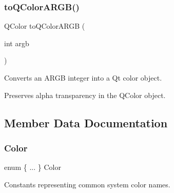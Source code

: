 \subsubsection{\texorpdfstring{to\+Q\+Color\+A\+R\+G\+B()}{toQColorARGB()}}
{\footnotesize\ttfamily Q\+Color to\+Q\+Color\+A\+R\+GB (\begin{DoxyParamCaption}\item[{int}]{argb }\end{DoxyParamCaption})\hspace{0.3cm}{\ttfamily [static]}}



Converts an A\+R\+GB integer into a Qt color object. 

Preserves alpha transparency in the Q\+Color object. 

\subsection{Member Data Documentation}
\mbox{\label{classGColor_a829e668b6af432af22e4fe68feff8c9a}} 
\subsubsection{\texorpdfstring{Color}{Color}}
{\footnotesize\ttfamily enum \{ ... \}   Color}



Constants representing common system color names. 

